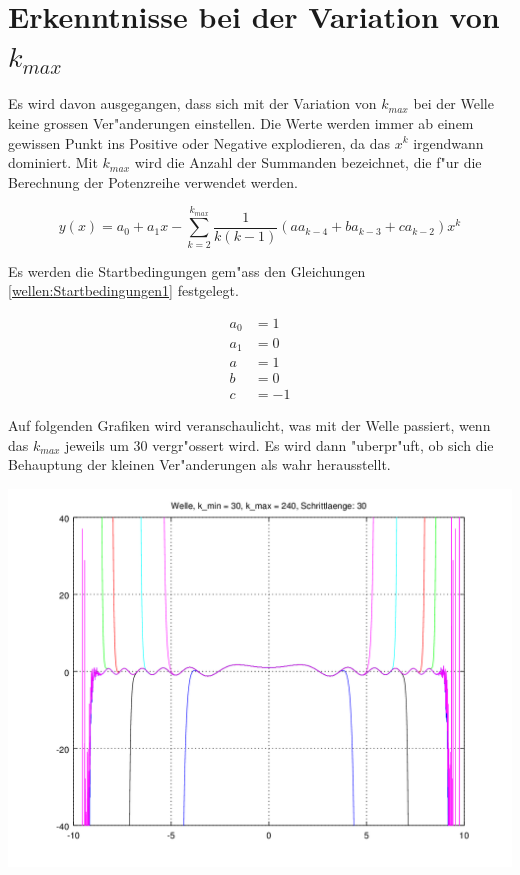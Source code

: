 \section{Erkenntnisse bei der Variation von \texorpdfstring{$k_{max}$}{kmax}}

Es wird davon ausgegangen, dass sich mit der Variation von $k_{max}$ bei der 
Welle keine grossen Ver"anderungen einstellen. Die Werte werden immer ab einem 
gewissen Punkt ins Positive oder Negative explodieren, da das $x^k$ irgendwann 
dominiert. Mit $k_{max}$ wird die Anzahl der Summanden bezeichnet, die f"ur die 
Berechnung der Potenzreihe verwendet werden. 

\begin{equation*}
y(x) = a_0 + a_1x 
-\sum_{k=2}^{k_{max}}\frac{1}{k(k-1)}(aa_{k-4}+ba_{k-3}+ca_{k-2})x^k
\end{equation*}

Es werden die Startbedingungen gem"ass den Gleichungen 
\ref{wellen:Startbedingungen1} festgelegt.

\begin{equation}
	\begin{split}
		a_0 &= 1\\
		a_1 &= 0\\
		a &= 1\\
		b &= 0\\
		c &= -1
	\end{split}
	\label{wellen:Startbedingungen1}
\end{equation}

Auf folgenden Grafiken wird veranschaulicht, was mit der Welle passiert, wenn 
das $k_{max}$ jeweils um 30 vergr"ossert wird. Es wird dann "uberpr"uft, ob 
sich die Behauptung der kleinen Ver"anderungen als wahr herausstellt.

\begin{center}
	\includegraphics[scale=0.69]{./wellen/images/kmax/krangewaveeven.png}
\end{center}

